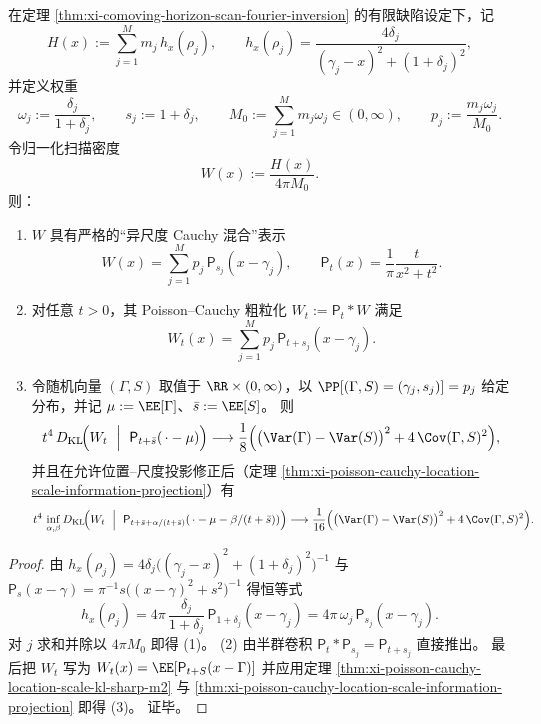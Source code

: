 \begin{corollary}\label{cor:xi-comoving-horizon-scan-poisson-kl-covariance-tensor}
在定理 \ref{thm:xi-comoving-horizon-scan-fourier-inversion} 的有限缺陷设定下，记
\[
H(x):=\sum_{j=1}^{M} m_j\,h_x(\rho_j),
\qquad
h_x(\rho_j)=\frac{4\delta_j}{(\gamma_j-x)^2+(1+\delta_j)^2},
\]
并定义权重
\[
\omega_j:=\frac{\delta_j}{1+\delta_j},\qquad
s_j:=1+\delta_j,\qquad
M_0:=\sum_{j=1}^{M} m_j\omega_j\in(0,\infty),
\qquad
p_j:=\frac{m_j\omega_j}{M_0}.
\]
令归一化扫描密度
\[
W(x):=\frac{H(x)}{4\pi M_0}.
\]
则：
\begin{enumerate}
  \item \(W\) 具有严格的“异尺度 Cauchy 混合”表示
  \[
  W(x)=\sum_{j=1}^{M} p_j\,\mathsf P_{s_j}(x-\gamma_j),
  \qquad
  \mathsf P_t(x)=\frac{1}{\pi}\frac{t}{x^2+t^2}.
  \]
  \item 对任意 \(t>0\)，其 Poisson--Cauchy 粗粒化 \(W_t:=\mathsf P_t*W\) 满足
  \[
  W_t(x)=\sum_{j=1}^{M} p_j\,\mathsf P_{t+s_j}(x-\gamma_j).
  \]
  \item 令随机向量 \((\Gamma,S)\) 取值于 \(\RR\times(0,\infty)\)，以
  \(
  \PP[(\Gamma,S)=(\gamma_j,s_j)]=p_j
  \)
  给定分布，并记
  \(
  \mu:=\EE[\Gamma]
\)、\(
  \bar s:=\EE[S]
  \)。
  则
  \[
  t^4\,D_{\mathrm{KL}}\!\Bigl(W_t\ \Bigm|\ \mathsf P_{t+\bar s}(\,\cdot-\mu)\Bigr)
  \longrightarrow
  \frac18\Bigl(\bigl(\Var(\Gamma)-\Var(S)\bigr)^2+4\,\Cov(\Gamma,S)^2\Bigr),
  \]
  并且在允许位置--尺度投影修正后（定理 \ref{thm:xi-poisson-cauchy-location-scale-information-projection}）有
  \[
  t^4\,\inf_{\alpha,\beta}
  D_{\mathrm{KL}}\!\Bigl(W_t\ \Bigm|\ \mathsf P_{t+\bar s+\alpha/(t+\bar s)}(\,\cdot-\mu-\beta/(t+\bar s))\Bigr)
  \longrightarrow
  \frac1{16}\Bigl(\bigl(\Var(\Gamma)-\Var(S)\bigr)^2+4\,\Cov(\Gamma,S)^2\Bigr).
  \]
\end{enumerate}
\end{corollary}
\begin{proof}
由 \(h_x(\rho_j)=4\delta_j\bigl((\gamma_j-x)^2+(1+\delta_j)^2\bigr)^{-1}\) 与
\(
\mathsf P_s(x-\gamma)=\pi^{-1}s\bigl((x-\gamma)^2+s^2\bigr)^{-1}
\)
得恒等式
\[
h_x(\rho_j)=4\pi\,\frac{\delta_j}{1+\delta_j}\,\mathsf P_{1+\delta_j}(x-\gamma_j)
=4\pi\,\omega_j\,\mathsf P_{s_j}(x-\gamma_j).
\]
对 \(j\) 求和并除以 \(4\pi M_0\) 即得 (1)。
(2) 由半群卷积 \(\mathsf P_t*\mathsf P_{s_j}=\mathsf P_{t+s_j}\) 直接推出。
最后把 \(W_t\) 写为
\(
W_t(x)=\EE[\mathsf P_{t+S}(x-\Gamma)]
\)
并应用定理 \ref{thm:xi-poisson-cauchy-location-scale-kl-sharp-m2} 与
\ref{thm:xi-poisson-cauchy-location-scale-information-projection} 即得 (3)。
证毕。
\end{proof}

\endinput

